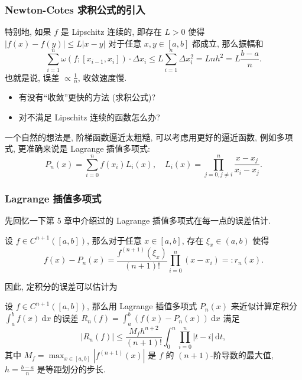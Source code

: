 \begin{frame}
\frametitle{Newton-Cotes 求积公式的引入}

特别地, 如果 $f$ 是 Lipschitz 连续的, 即存在 $L > 0$ 使得 $|f(x) - f(y)| \leqslant L |x - y|$ 对于任意 $x, y \in [a, b]$ 都成立, 那么振幅和
\[
\sum_{i=1}^n \omega(f; [x_{i-1}, x_i]) \cdot \Delta x_i \leqslant L \sum_{i=1}^n \Delta x_i^2 = L n h^2 = L \frac{b - a}{n}.
\]
也就是说, 误差 $\propto \frac{1}{n}$, 收敛速度慢.

\pause

\begin{question}
\begin{itemize}
\item 有没有``收敛''更快的方法 (求积公式)?
\item 对不满足 Lipschitz 连续的函数怎么办?
\end{itemize}
\end{question}

\pause
\vspace{0.5em}

一个自然的想法是, 阶梯函数逼近太粗糙, 可以考虑用更好的逼近函数, 例如多项式, 更准确来说是 Lagrange 插值多项式:
\[
P_n(x) = \sum_{i=0}^n f(x_i) L_i(x), \quad L_i(x) = \prod_{j=0, j \neq i}^n \frac{x - x_j}{x_i - x_j}.
\]

\end{frame}


\begin{frame}
\frametitle{Lagrange 插值多项式}

先回忆一下第 5 章中介绍过的 Lagrange 插值多项式在每一点的误差估计.

\begin{prop}[第 5 章定理 5.3.3]
设 $f \in C^{n+1}([a, b])$, 那么对于任意 $x \in [a, b]$, 存在 $\xi_x \in (a, b)$ 使得
\[
f(x) - P_n(x) = \frac{f^{(n+1)}(\xi_x)}{(n+1)!} \prod_{i=0}^n (x - x_i) =: r_n(x).
\]
\end{prop}

\pause

因此, 定积分的误差可以估计为

\begin{thm}
\label{thm:lagrange-interpolation-error-estimate-for-integration}
设 $f \in C^{n+1}([a, b])$, 那么用 Lagrange 插值多项式 $P_n(x)$ 来近似计算定积分 $\int_a^b f(x) ~ \mathrm{d}x$ 的误差 $R_n(f) = \int_a^b (f(x) - P_n(x)) ~ \mathrm{d}x$ 满足
\[
|R_n(f)| \leqslant \frac{M_f h^{n+2}}{(n+1)!} \int_0^n \prod_{i=0}^n |t - i| ~ \mathrm{d}t,
\]
其中 $M_f = \max_{x \in [a, b]} |f^{(n+1)}(x)|$ 是 $f$ 的 $(n+1)$-阶导数的最大值, $h = \frac{b - a}{n}$ 是等距划分的步长.
\end{thm}

\end{frame}

